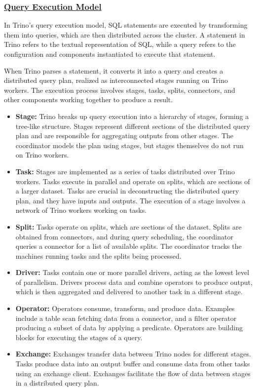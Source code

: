 \documentclass[conference]{IEEEtran}
\begin{document}
\subsubsection{\textbf{\underline{Query Execution Model}}}

In Trino's query execution model, SQL statements are executed by transforming them into queries, which are then distributed across the cluster.
A statement in Trino refers to the textual representation of SQL, while a query refers to the configuration and components instantiated to execute that statement.

When Trino parses a statement, it converts it into a query and creates a distributed query plan, realized as interconnected stages 
running on Trino workers. The execution process involves stages, tasks, splits, connectors, and other components working together 
to produce a result.

\begin{itemize}
    \item \textbf{Stage:} Trino breaks up query execution into a hierarchy of stages, forming a tree-like structure. 
    Stages represent different sections of the distributed query plan and are responsible for aggregating outputs from other stages. 
    The coordinator models the plan using stages, but stages themselves do not run on Trino workers.
    \item \textbf{Task:} Stages are implemented as a series of tasks distributed over Trino workers. 
    Tasks execute in parallel and operate on splits, which are sections of a larger dataset. Tasks are crucial in deconstructing the 
    distributed query plan, and they have inputs and outputs. The execution of a stage involves a network of Trino workers working on tasks.
    \item \textbf{Split:} Tasks operate on splits, which are sections of the dataset. Splits are obtained from connectors, and during query 
    scheduling, the coordinator queries a connector for a list of available splits. The coordinator tracks the machines running tasks and the 
    splits being processed.
    \item \textbf{Driver:} Tasks contain one or more parallel drivers, acting as the lowest level of parallelism. Drivers process data and combine 
    operators to produce output, which is then aggregated and delivered to another task in a different stage.
    \item \textbf{Operator:} Operators consume, transform, and produce data. Examples include a table scan fetching data from a 
    connector, and a filter operator producing a subset of data by applying a predicate. Operators are building blocks for executing the stages 
    of a query.
    \item \textbf{Exchange:} Exchanges transfer data between Trino nodes for different stages. Tasks produce data into an output buffer and consume 
    data from other tasks using an exchange client. Exchanges facilitate the flow of data between stages in a distributed query plan.
\end{itemize}
\end{document}
